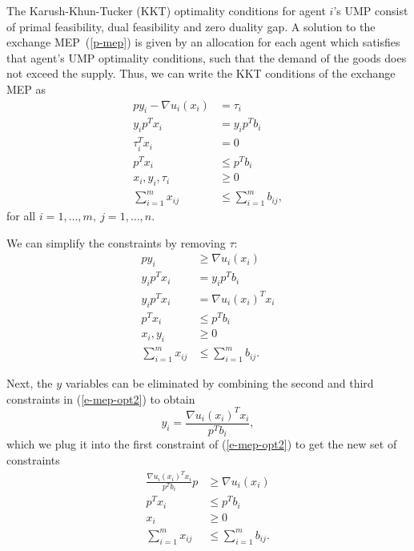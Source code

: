 \documentclass[12pt]{article}
\begin{document}
The Karush-Khun-Tucker (KKT) optimality conditions for agent $i$'s UMP consist
of primal feasibility, dual feasibility and zero duality gap. A solution to the
exchange MEP~(\ref{p-mep}) is given by an allocation for each agent which
satisfies that agent's UMP optimality conditions, such that the demand of the
goods does not exceed the supply. Thus, we can write the KKT conditions of the
exchange MEP as
\begin{equation}
\begin{aligned}
p y_i - \nabla u_i(x_i)&= \tau_i\\
y_i p^T x_i &= y_i p^T b_i\\
\tau_i^T x_i &= 0\\
p^T x_i &\leq p^T b_i\\
x_i, y_i, \tau_i &\geq 0\\
\sum_{i=1}^m x_{ij} &\leq \sum_{i=1}^m b_{ij},
\end{aligned}
\label{e-mep-opt1}
\end{equation}
for all $i=1,\ldots,m,\ j=1,\ldots,n$.

We can simplify the constraints by removing $\tau$:
\begin{equation}
\begin{aligned}
p y_i &\geq \nabla u_i(x_i) \\
y_i p^T x_i &= y_i p^T b_i \\
y_i p^T x_i &= \nabla u_i(x_i)^T x_i\\
p^T x_i &\leq p^T b_i\\
x_i, y_i &\geq 0\\
\sum_{i=1}^m x_{ij} &\leq \sum_{i=1}^m b_{ij}.
\end{aligned}
\label{e-mep-opt2}
\end{equation}

Next, the $y$ variables can be eliminated by combining the second and third
constraints in (\ref{e-mep-opt2}) to obtain
\[
y_i = \frac{\nabla u_i(x_i)^T x_i}{p^T b_i},
\]
which we plug it into the first constraint of (\ref{e-mep-opt2}) to get the new
set of constraints
\begin{equation}
\begin{aligned}
\frac{\nabla u_i(x_i)^T x_i}{p^T b_i} p &\geq \nabla u_i(x_i) \\
p^T x_i &\leq p^T b_i\\
x_i &\geq 0\\
\sum_{i=1}^m x_{ij} &\leq \sum_{i=1}^m b_{ij}.
\end{aligned}
\label{e-mep-opt3}
\end{equation}
\end{document}
